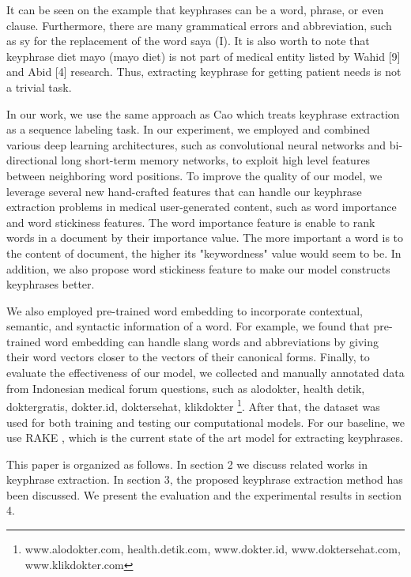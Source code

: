 It can be seen on the example that keyphrases can be a word,
phrase, or even clause. Furthermore, there are many grammatical
errors and abbreviation, such as sy for the replacement of the word
saya (I). It is also worth to note that keyphrase diet mayo (mayo
diet) is not part of medical entity listed by Wahid [9] and Abid
[4] research. Thus, extracting keyphrase for getting patient needs
is not a trivial task.

In our work, we use the same approach as Cao \cite{cao2010automatically} which treats keyphrase extraction as a sequence labeling task. In our experiment, we employed and combined various deep learning architectures, such as convolutional neural networks and bi-directional long short-term memory networks, to exploit high level features between neighboring word positions. To improve the quality of our model, we leverage several new hand-crafted features that can handle our keyphrase extraction problems in medical user-generated content, such as word importance and word stickiness features. The word importance feature is enable to rank words in a document by their importance value. The more important a word is to the content of document, the higher its "keywordness" value would seem to be. In addition, we also propose word stickiness feature to make our model constructs keyphrases better. 

We also employed pre-trained word embedding to incorporate contextual, semantic, and syntactic information of a word. For example, we found that pre-trained word embedding can handle slang words and abbreviations by giving their word vectors closer to the vectors of their canonical forms. Finally, to evaluate the effectiveness of our model, we collected and manually annotated data from Indonesian medical forum questions, such as alodokter, health detik, doktergratis, dokter.id, doktersehat, klikdokter \footnote{www.alodokter.com, health.detik.com, www.dokter.id, www.doktersehat.com, www.klikdokter.com}. After that, the dataset was used for both training and testing our computational models. For our baseline, we use RAKE  \cite{rake}, which is the current state of the art model for extracting keyphrases.


This paper is organized as follows.  In section 2 we discuss related works in keyphrase extraction. In section 3, the proposed keyphrase extraction method has been discussed. We present the evaluation and the experimental results in section 4. 
\fi
